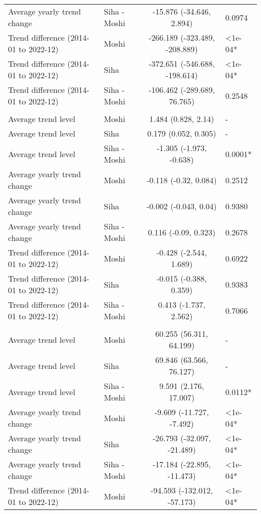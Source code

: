 \begin{longtable}{l|lcl}
Average yearly trend change & Siha - Moshi & -15.876 (-34.646, 2.894) & 0.0974 \\ 
Trend difference (2014-01 to 2022-12) & Moshi & -266.189 (-323.489, -208.889) & <1e-04* \\ 
Trend difference (2014-01 to 2022-12) & Siha & -372.651 (-546.688, -198.614) & <1e-04* \\ 
Trend difference (2014-01 to 2022-12) & Siha - Moshi & -106.462 (-289.689, 76.765) & 0.2548 \\ 
\midrule\addlinespace[2.5pt]
\multicolumn{4}{l}{Leprosy} \\ 
\midrule\addlinespace[2.5pt]
Average trend level & Moshi & 1.484 (0.828, 2.14) & - \\ 
Average trend level & Siha & 0.179 (0.052, 0.305) & - \\ 
Average trend level & Siha - Moshi & -1.305 (-1.973, -0.638) & 0.0001* \\ 
Average yearly trend change & Moshi & -0.118 (-0.32, 0.084) & 0.2512 \\ 
Average yearly trend change & Siha & -0.002 (-0.043, 0.04) & 0.9380 \\ 
Average yearly trend change & Siha - Moshi & 0.116 (-0.09, 0.323) & 0.2678 \\ 
Trend difference (2014-01 to 2022-12) & Moshi & -0.428 (-2.544, 1.689) & 0.6922 \\ 
Trend difference (2014-01 to 2022-12) & Siha & -0.015 (-0.388, 0.359) & 0.9383 \\ 
Trend difference (2014-01 to 2022-12) & Siha - Moshi & 0.413 (-1.737, 2.562) & 0.7066 \\ 
\midrule\addlinespace[2.5pt]
\multicolumn{4}{l}{Malaria} \\ 
\midrule\addlinespace[2.5pt]
Average trend level & Moshi & 60.255 (56.311, 64.199) & - \\ 
Average trend level & Siha & 69.846 (63.566, 76.127) & - \\ 
Average trend level & Siha - Moshi & 9.591 (2.176, 17.007) & 0.0112* \\ 
Average yearly trend change & Moshi & -9.609 (-11.727, -7.492) & <1e-04* \\ 
Average yearly trend change & Siha & -26.793 (-32.097, -21.489) & <1e-04* \\ 
Average yearly trend change & Siha - Moshi & -17.184 (-22.895, -11.473) & <1e-04* \\ 
Trend difference (2014-01 to 2022-12) & Moshi & -94.593 (-132.012, -57.173) & <1e-04* \\ 

\end{longtable}
